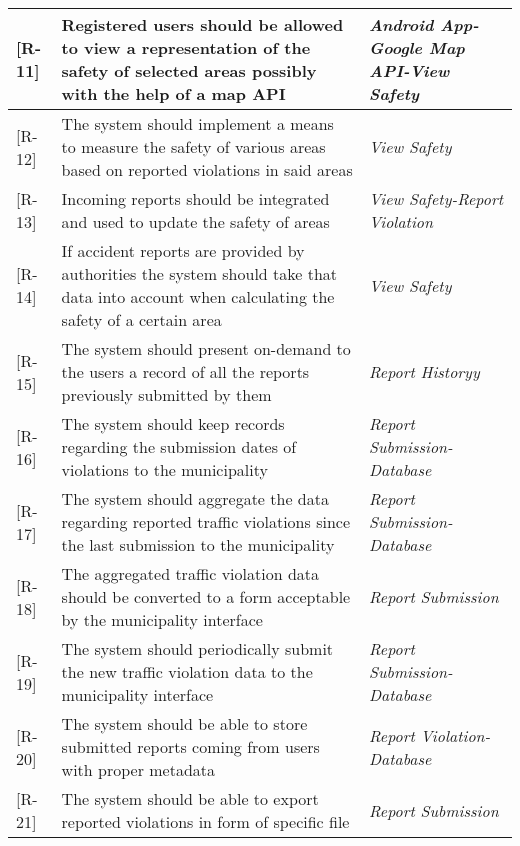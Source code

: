 \begin{table}[H]
\begin{tabulary}{\textwidth}{|J|J|J|}
 [R-11] &  Registered users should be allowed to view a representation of the safety of selected areas possibly with the help of a map API & \emph{Android App-Google Map API-View Safety} 		\\ \hline 

 [R-12] & The system should implement a means to measure the safety of various areas based on reported violations in said areas & \emph{View Safety} 		\\ \hline 

 [R-13] & Incoming reports should be integrated and used to update the safety of areas & \emph{View Safety-Report Violation} 		\\ \hline 

 [R-14] & If accident reports are provided by authorities the system should take that data into account when calculating the safety of a certain area & \emph{View Safety} 		\\ \hline 

 [R-15] &  The system should present on-demand to the users a record of all the reports previously submitted by them & \emph{Report Historyy} 		\\ \hline 

 [R-16] & The system should keep records regarding the submission dates of violations to the municipality & \emph{Report Submission-Database} 		\\ \hline 

 [R-17] & The system should aggregate the data regarding reported traffic violations since the last submission to the municipality & \emph{Report Submission-Database} 		\\ \hline 

 [R-18] & The aggregated traffic violation data should be converted to a form acceptable by the municipality interface & \emph{Report Submission} 		\\ \hline 

 [R-19] & The system should periodically submit the new traffic violation data to the municipality
interface & \emph{Report Submission-Database} 		\\ \hline 

 [R-20] & The system should be able to store submitted reports coming from users with proper metadata & \emph{Report Violation-Database} 		\\ \hline

 [R-21] & The system should be able to export reported violations in form of specific file & \emph{Report Submission} 		\\ \hline 


\end{tabulary}
\end{table}
